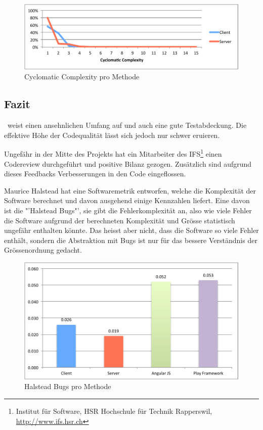 	
	\begin{figure}[H]
		\includegraphics[width=\textwidth]{projectPlan/media/img/methodComplexityCyclomaticComplexity.pdf}
		\centering
		\caption{Cyclomatic Complexity pro Methode}
		\label{fig:methodComplexityCyclomaticComplexity}
	\end{figure}
	
	
	\subsection{Fazit}
		\eeppi\ weist einen ansehnlichen Umfang auf und auch eine gute Testabdeckung.
		Die effektive Höhe  der Codequalität lässt sich jedoch nur schwer eruieren.	
		
		Ungefähr in der Mitte des Projekts hat ein Mitarbeiter des IFS\footnote{Institut für Software, HSR Hochschule für Technik Rapperswil, \url{http://www.ifs.hsr.ch}} einen Codereview durchgeführt und positive Bilanz gezogen.
		Zusätzlich sind aufgrund dieses Feedbacks Verbesserungen in den Code eingeflossen.
		
		Maurice Halstead hat eine Softwaremetrik entworfen,
		welche die Komplexität der Software berechnet und davon ausgehend einige Kennzahlen liefert.
		Eine davon ist die "'Halstead Bugs"', sie gibt die Fehlerkomplexität an,
		also wie viele Fehler die Software aufgrund der berechneten Komplexität und Grösse statistisch ungefähr enthalten könnte.
		Das heisst aber nicht, dass die Software so viele Fehler enthält,
		sondern die Abstraktion mit Bugs ist nur für das bessere Verständnis der Grössenordnung gedacht.
		
		\begin{figure}[H]
			\includegraphics[width=\textwidth]{projectPlan/media/img/halsteadBugsPerMethod.pdf}
			\centering
			\caption{Halstead Bugs pro Methode}
			\label{fig:halsteadBugsPerMethod}
		\end{figure}
		
